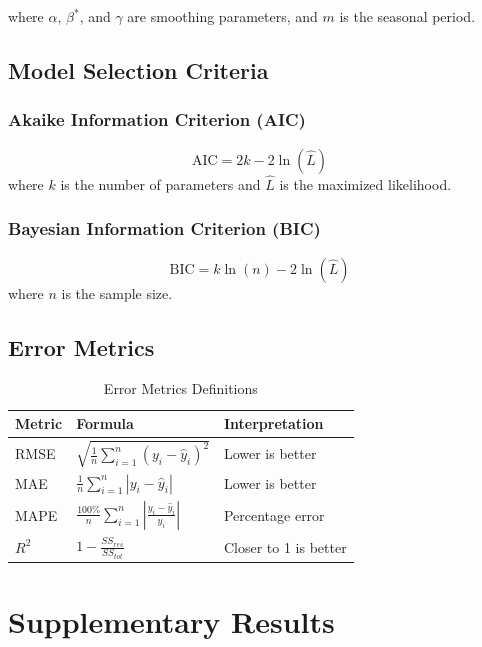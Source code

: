 \documentclass[12pt,a4paper]{report}
\begin{document}
where $\alpha$, $\beta^*$, and $\gamma$ are smoothing parameters, and $m$ is the seasonal period.

\section{Model Selection Criteria}

\subsection{Akaike Information Criterion (AIC)}
\begin{equation}
\text{AIC} = 2k - 2\ln(\hat{L})
\end{equation}
where $k$ is the number of parameters and $\hat{L}$ is the maximized likelihood.

\subsection{Bayesian Information Criterion (BIC)}
\begin{equation}
\text{BIC} = k\ln(n) - 2\ln(\hat{L})
\end{equation}
where $n$ is the sample size.

\section{Error Metrics}

\begin{table}[H]
\centering
\caption{Error Metrics Definitions}
\begin{tabular}{lll}
\toprule
\textbf{Metric} & \textbf{Formula} & \textbf{Interpretation} \\
\midrule
RMSE & $\sqrt{\frac{1}{n}\sum_{i=1}^n(y_i - \hat{y}_i)^2}$ & Lower is better \\
MAE & $\frac{1}{n}\sum_{i=1}^n|y_i - \hat{y}_i|$ & Lower is better \\
MAPE & $\frac{100\%}{n}\sum_{i=1}^n\left|\frac{y_i - \hat{y}_i}{y_i}\right|$ & Percentage error \\
$R^2$ & $1 - \frac{SS_{res}}{SS_{tot}}$ & Closer to 1 is better \\
\bottomrule
\end{tabular}
\end{table}

\chapter{Supplementary Results}
\label{app:supplementary}
\end{document}
